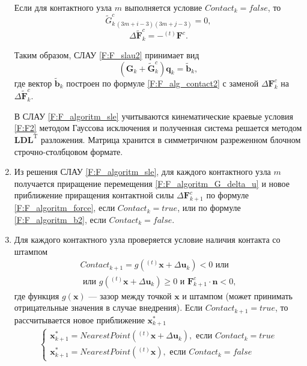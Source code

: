 \begin{enumerate}
	Если для контактного узла $m$ выполняется условие $Contact_k=false$, то
	\begin{equation}
	\tilde{G}_{k\,(3m+i-3)(3m+j-3)}^{c}=0,
	\label{F:F_algoritm_G2}
	\end{equation}
	\begin{equation}
	\Delta\tilde{\mathbf{F}}_k^c=-{}^{(t)}\mathbf{F}^c.
	\label{F:F_algoritm_b2}
	\end{equation}
	
	Таким образом, СЛАУ \eqref{F:F_slau2} принимает вид
	\begin{equation}
	\left(\mathbf{G}_k+\tilde{\mathbf{G}}_k^c\right)\mathbf{q}_k=\tilde{\mathbf{b}}_k,
	\label{F:F_algoritm_sle}
	\end{equation}
	где вектор $\tilde{\mathbf{b}}_k$ построен по формуле \eqref{F:F_alg_contact2} с заменой $\Delta\mathbf{F}_k^c$ на $\Delta\tilde{\mathbf{F}}_k^c$.
	
	В СЛАУ \eqref{F:F_algoritm_sle} учитываются кинематические краевые условия \eqref{F:F2} методом Гауссова исключения и полученная система решается методом $\mathbf{LDL}^{\mathrm{T}}$ разложения. Матрица хранится в симметричном разреженном блочном строчно-столбцовом формате.
	
	\item
	Из решения СЛАУ \eqref{F:F_algoritm_sle}, для каждого контактного узла $m$ получается приращение перемещения \eqref{F:F_algoritm_G_delta_u} и новое приближение приращения контактной силы $\Delta\mathbf{F}_{k+1}^{c}$ по формуле \eqref{F:F_algoritm_force}, если $Contact_k=true$, или по формуле \eqref{F:F_algoritm_b2}, если $Contact_k=false$.
	
	\item
	Для каждого контактного узла проверяется условие наличия контакта со штампом
	\begin{equation}
	\begin{gathered}
	Contact_{k+1}=g\left({}^{(t)}\mathbf{x}+\Delta\mathbf{u}_k\right)<0 \mbox{ или }\\
	\mbox{ или } g\left({}^{(t)}\mathbf{x}+\Delta\mathbf{u}_k\right)\geqslant 0 \mbox{ и } \mathbf{F}_{k+1}^{c}\cdot \mathbf{n}<0,
	\label{F:F_algoritm_contact_condition}
	\end{gathered}
	\end{equation}
	где функция $g\left(\mathbf{x}\right)$ --- зазор между точкой $\mathbf{x}$ и штампом (может принимать отрицательные значения в случае внедрения). Если $Contact_{k+1}=true$, то рассчитывается новое приближение $\mathbf{x}_{k+1}^*$
	\begin{equation}
	\begin{gathered}
	\begin{cases}
	\mathbf{x}_{k+1}^*=NearestPoint\left({}^{(t)}\mathbf{x}+\Delta\mathbf{u}_k\right),\mbox{ если }Contact_k=true\\
	\mathbf{x}_{k+1}^*=NearestPoint\left({}^{(t)}\mathbf{x}\right),\mbox{ если }Contact_k=false
	\end{cases}\\
	\end{gathered}
	\label{F:F_algoritm_contact_new}
	\end{equation}
	

\end{enumerate}

